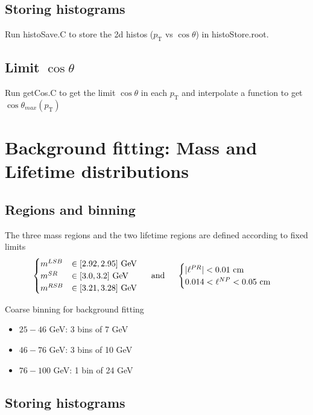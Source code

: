 \documentclass{article}
\newcommand{\pt}{p_\text{T}}
\newcommand{\cost}{\cos\theta}
\begin{document}
\subsection{Storing histograms}

Run histoSave.C to store the 2d histos ($\pt$ vs $\cost$) in histoStore.root.

\subsection{Limit $\cost$}

Run getCos.C to get the limit $\cost$ in each $\pt$ and interpolate a function to get $\cost_{max}(\pt)$

\pagebreak

\section{Background fitting: Mass and Lifetime distributions}
\subsection{Regions and binning} 

The three mass regions and the two lifetime regions are defined according to fixed limits
\begin{equation}\begin{cases}
m^{LSB}&\in[2.92, 2.95] \text{ GeV}\\
m^{SR}&\in[3.0, 3.2]  \text{ GeV}\\
m^{RSB}&\in[3.21, 3.28]  \text{ GeV}\\
\end{cases}\hspace{0.5cm}\text{and}\hspace{0.5cm}
\begin{cases}
|\ell^{PR}| < 0.01\text{ cm} \\
0.014 < \ell^{NP} < 0.05\text{ cm}
\end{cases}
\end{equation}

Coarse binning for background fitting
\begin{itemize}
\item $25-46$ GeV: 3 bins of 7 GeV
\item $46-76$ GeV: 3 bins of 10 GeV
\item $76-100$ GeV: 1 bin of 24 GeV
\end{itemize}

\subsection{Storing histograms}
\end{document}

